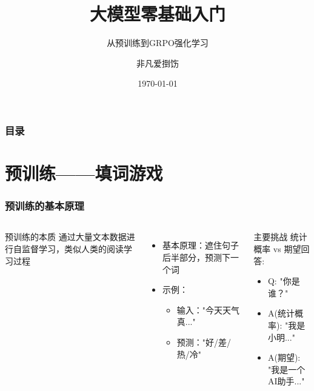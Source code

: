 \documentclass[10pt,aspectratio=169]{beamer}
\title{大模型零基础入门}         %
\subtitle{从预训练到GRPO强化学习} %
\author{非凡爱捯饬}               %
\institute{河南大学}    %
\date{\today}                   %
\begin{document}
\begin{frame}
    \titlepage  
\end{frame}

\begin{frame}
    \frametitle{目录}
    \tableofcontents
\end{frame}

\section{预训练——填词游戏}
\begin{frame}
    \frametitle{预训练的基本原理}
    \begin{columns}[T]
        \begin{block}{预训练的本质}
            通过大量文本数据进行自监督学习，类似人类的阅读学习过程
        \end{block}
        
        \begin{itemize}
            \item 基本原理：遮住句子后半部分，预测下一个词
            \item 示例：
                \begin{itemize}
                    \item 输入："今天天气真..."
                    \item 预测："好/差/热/冷"
                \end{itemize}
        \end{itemize}

        \begin{alertblock}{主要挑战}
            统计概率 vs 期望回答:
            \begin{itemize}
                \item Q: "你是谁？"
                \item A(统计概率): "我是小明..."
                \item A(期望): "我是一个AI助手..."
            \end{itemize}
        \end{alertblock}
    \end{columns}
\end{frame}

\end{document}
